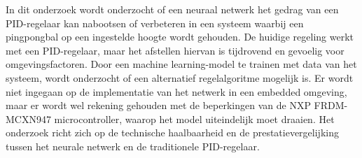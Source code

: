 In dit onderzoek wordt onderzocht of een neuraal netwerk het gedrag van een PID-regelaar kan nabootsen of verbeteren in een systeem waarbij een pingpongbal op een ingestelde hoogte wordt gehouden. De huidige regeling werkt met een PID-regelaar, maar het afstellen hiervan is tijdrovend en gevoelig voor omgevingsfactoren. Door een machine learning-model te trainen met data van het systeem, wordt onderzocht of een alternatief regelalgoritme mogelijk is. Er wordt niet ingegaan op de implementatie van het netwerk in een embedded omgeving, maar er wordt wel rekening gehouden met de beperkingen van de NXP FRDM-MCXN947 microcontroller, waarop het model uiteindelijk moet draaien. Het onderzoek richt zich op de technische haalbaarheid en de prestatievergelijking tussen het neurale netwerk en de traditionele PID-regelaar.